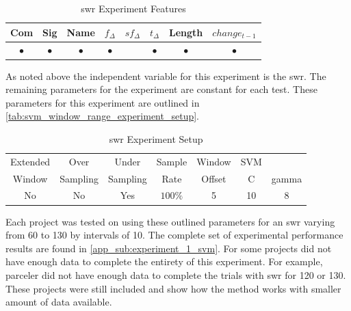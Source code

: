 \begin{table}[h]
\begin{center}

    \begin{tabular}{|c|c|c|c|c|c|c|c|}
        \hline
        Com & Sig & Name & $f_{\Delta}$ & $sf_{\Delta}$ & $t_\Delta$ & Length & $change_{t-1}$ \\
        \hline
        $\bullet$ & $\bullet$ & $\bullet$ & $\bullet$ & & $\bullet$ & $\bullet$ & $\bullet$ \\ \hline
    \end{tabular}
    \caption{\gls{swr} Experiment Features}
    \label{tab:svm_window_range_experiment_features}
\end{center}
\end{table}

As noted above the independent variable for this experiment is the \gls{swr}. The remaining parameters for the experiment are constant for each test. These parameters for this experiment are outlined in \autoref{tab:svm_window_range_experiment_setup}.

\begin{table}[h]
\begin{center}

    \begin{tabular}{|c|c|c|c|c|cc|}
        \hline
        Extended & Over & Under & Sample & Window & SVM & \\
        Window & Sampling & Sampling & Rate & Offset & C & gamma \\ \hline
        No & No & Yes & $100\%$ & 5 & 10 & 8 \\ \hline
    \end{tabular}
    \caption{\gls{swr} Experiment Setup}
    \label{tab:svm_window_range_experiment_setup}
\end{center}

\end{table}

Each project was tested on using these outlined parameters for an \gls{swr} varying from 60 to 130 by intervals of 10. The complete set of experimental performance results are found in \autoref{app_sub:experiment_1_svm}. For some projects did not have enough data to complete the entirety of this experiment. For example, parceler did not have enough data to complete the trials with \gls{swr} for 120 or 130. These projects were still included and show how the method works with smaller amount of data available.

